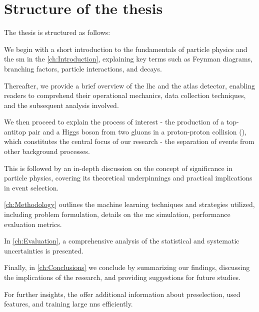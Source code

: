 \chapter*{Structure of the thesis}

The thesis is structured as follows:

We begin with a short introduction to the fundamentals of particle physics and the \gls{sm} in the
\autoref{ch:Introduction}, explaining key terms such as Feynman diagrams, branching factors, particle
interactions, and decays.

Thereafter, we provide a brief overview of the \gls{lhc} and the \gls{atlas} detector, enabling readers to comprehend
their operational mechanics, data collection techniques, and the subsequent analysis involved.

We then proceed to explain the process of interest - the production of a top-antitop pair and a Higgs boson from two
gluons in a proton-proton collision (\tth), which constitutes the central focus of our research - the separation of \tth
events from other background processes.

This is followed by an in-depth discussion on the concept of significance in particle physics, covering its theoretical
underpinnings and practical implications in event selection.

\autoref{ch:Methodology} outlines the machine learning techniques and strategies utilized, including
problem formulation, details on the \gls{mc} simulation, performance evaluation metrics.

In \autoref{ch:Evaluation}, a comprehensive analysis of the statistical and systematic uncertainties is
presented.

Finally, in \autoref{ch:Conclusions} we conclude by summarizing our findings, discussing the implications
of the research, and providing suggestions for future studies.

For further insights, the \textbf{} offer additional information about preselection, used features, and
training large \glspl{nn} efficiently.